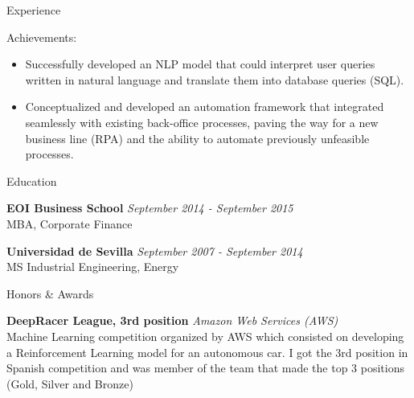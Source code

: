 \documentclass{cv}
\begin{document}
\begin{rSection}{Experience}
\begin{rSubsection}
\begin{itemize}
			\end{itemize}
			
			\vspace{2mm}
			
			\item Achievements:
			\begin{itemize}
				
				\item Successfully developed an NLP model that could interpret user queries written in natural language and translate them into database queries (SQL).
				\item Conceptualized and developed an automation framework that integrated seamlessly with existing back-office processes, paving the way for a new business line (RPA) and the ability to automate previously unfeasible processes.
				
			\end{itemize}
			
		\end{rSubsection}
				
	\end{rSection}
	
	
	
	\begin{rSection}{Education}
		
		{\bf EOI Business School } \hfill {\em September 2014 - September 2015} 
		\\ MBA, Corporate Finance
		
		{\bf Universidad de Sevilla } \hfill {\em September 2007 - September 2014}           
		\\ MS Industrial Engineering, Energy
		
	\end{rSection}
	
	
	\begin{rSection}{Honors \& Awards}

		{\bf DeepRacer League, 3rd position } \hfill {\em Amazon Web Services (AWS)} \\
		Machine Learning competition organized by AWS which consisted on developing a Reinforcement Learning model for an autonomous car. I got the 3rd position in Spanish competition and was member of the team that made the top 3 positions (Gold, Silver and Bronze)
		
	\end{rSection}
	
\end{document}
